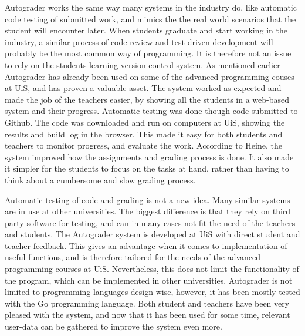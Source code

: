 Autograder works the same way many systems in the industry do, like automatic code testing of submitted work, and mimics the the real world scenarios that the student will encounter later. When students graduate and start working in the industry, a similar process of code review and test-driven development will probably be the most common way of programming. It is therefore not an issue to rely on the students learning version control system. As mentioned earlier Autograder has already been used on some of the advanced programming couses at UiS, and has proven a valuable asset. The system worked as expected and made the job of the teachers easier, by showing all the students in a web-based system and their progress. Automatic testing was done though code submitted to Github. The code was downloaded and run on computers at UiS, showing the results and build log in the browser. This made it easy for both students and teachers to monitor progress, and evaluate the work.  According to Heine, the system improved how the assignments and grading process is done. It also made it simpler for the  students to focus on the tasks at hand, rather than having to think about a cumbersome and slow grading process.

Automatic testing of code and grading is not a new idea. Many similar systems are in use at other universities. The biggest difference is that they rely on third party software for testing, and can in many cases not fit the need of the teachers and students. The Autograder system is developed at UiS with direct student and teacher feedback. This gives an advantage when it comes to implementation of useful functions, and is therefore tailored for the needs of the advanced programming courses at UiS. Nevertheless, this does not limit the functionality of the program, which can be implemented in other universities. Autograder is not limited to programming languages design-wise, however, it has been mostly tested with the Go programming language. Both student and teachers have been very pleased with the system, and now that it has been used for some time, relevant user-data can be gathered to improve the system even more.